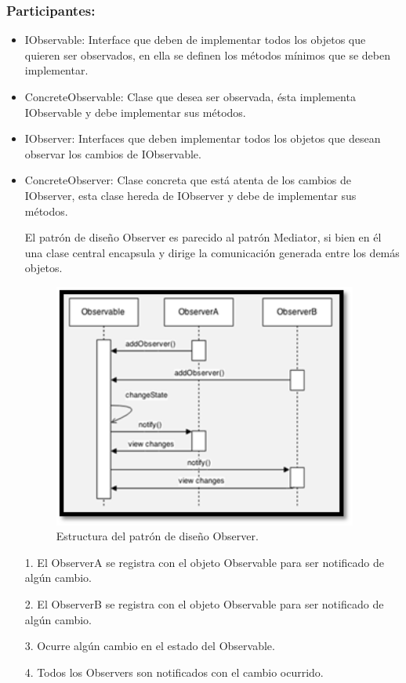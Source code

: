 \documentclass[12pt,letterpaper]{article}
\begin{document}
\subsubsection{Participantes: }
\begin{itemize}

\item IObservable: Interface que deben de implementar todos los objetos que quieren ser observados, en ella se definen los métodos mínimos que se deben implementar. 
\item ConcreteObservable: Clase que desea ser observada, ésta implementa IObservable y debe implementar sus métodos. 
\item IObserver: Interfaces que deben implementar todos los objetos que desean observar los cambios de IObservable. 
\item ConcreteObserver: Clase concreta que está atenta de los cambios de IObserver, esta clase hereda de IObserver y debe de implementar sus métodos.


El patrón de diseño Observer es parecido al patrón Mediator, si bien en él una clase central encapsula y dirige la comunicación generada entre los demás objetos.  


\begin{figure}[h]
\begin{center}
\includegraphics[width=10cm]{./Imagenes/image1.jpg}
\caption{Estructura del patrón de diseño Observer.}
\label{rg1}
\end{center}
\end{figure}
\end{itemize}


\begin{itemize}
\item [1.] El ObserverA se registra con el objeto Observable para ser notificado de algún cambio.
\item [2.] El ObserverB se registra con el objeto Observable para ser notificado de algún cambio. 
\item [3.] Ocurre algún cambio en el estado del Observable. 
\item [4.] Todos los Observers son notificados con el cambio ocurrido. 
    
\end{itemize} 
\end{document}
